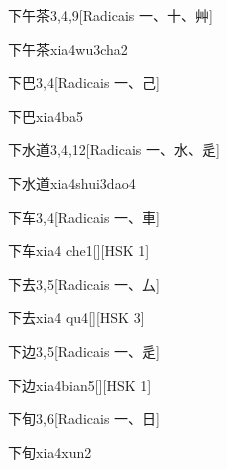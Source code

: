 \begin{entry}{下午茶}{3,4,9}[Radicais ⼀、⼗、⾋]
  \begin{phonetics}{下午茶}{xia4wu3cha2}
  \end{phonetics}
\end{entry}

\begin{entry}{下巴}{3,4}[Radicais ⼀、⼰]
  \begin{phonetics}{下巴}{xia4ba5}
  \end{phonetics}
\end{entry}

\begin{entry}{下水道}{3,4,12}[Radicais ⼀、⽔、⾡]
  \begin{phonetics}{下水道}{xia4shui3dao4}
  \end{phonetics}
\end{entry}

\begin{entry}{下车}{3,4}[Radicais ⼀、⾞]
  \begin{phonetics}{下车}{xia4 che1}[][HSK 1]
  \end{phonetics}
\end{entry}

\begin{entry}{下去}{3,5}[Radicais ⼀、⼛]
  \begin{phonetics}{下去}{xia4 qu4}[][HSK 3]
  \end{phonetics}
\end{entry}

\begin{entry}{下边}{3,5}[Radicais ⼀、⾡]
  \begin{phonetics}{下边}{xia4bian5}[][HSK 1]
  \end{phonetics}
\end{entry}

\begin{entry}{下旬}{3,6}[Radicais ⼀、⽇]
  \begin{phonetics}{下旬}{xia4xun2}
  \end{phonetics}
\end{entry}

